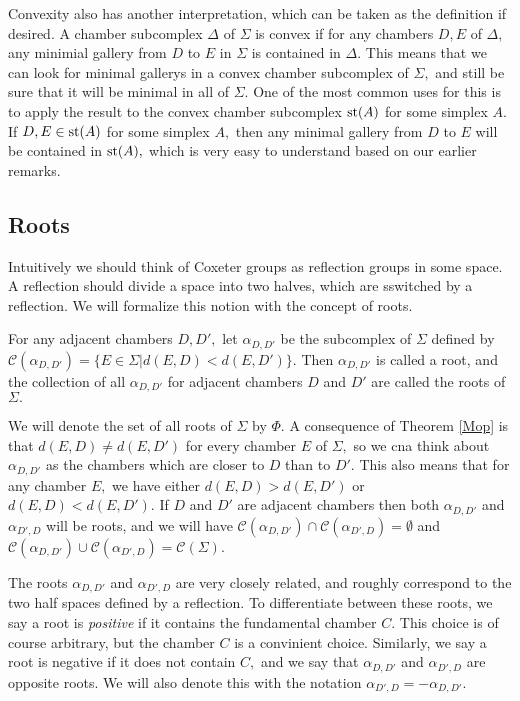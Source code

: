 \documentclass[class=book, crop=false,12 pt]{standalone}
\begin{document}
Convexity also has another interpretation, which can be taken as the definition if desired. A chamber subcomplex $\Delta$ of $\Sigma$ is convex if for any chambers $D,E$ of $\Delta,$ any minimial gallery from $D$ to $E$ in $\Sigma$ is contained in $\Delta.$ This means that we can look for minimal gallerys in a convex chamber subcomplex of $\Sigma,$ and still be sure that it will be minimal in all of $\Sigma.$ One of the most common uses for this is to apply the result to the convex chamber subcomplex $\mathrm{st}(A)$ for some simplex $A.$ If $D,E\in \mathrm{st}(A)$ for some simplex $A,$ then any minimal gallery from $D$ to $E$ will be contained in $\mathrm{st}(A),$ which is very easy to understand based on our earlier remarks.

\subsection{Roots}
Intuitively we should think of Coxeter groups as reflection groups in some space. A reflection should divide a space into two halves, which are sswitched by a reflection. We will formalize this notion with the concept of roots.

\begin{defn}
	\label{defn:root}
	For any adjacent chambers $D,D',$ let $\alpha_{D,D'}$ be the subcomplex of $\Sigma$ defined by $\mathcal{C}(\alpha_{D,D'})=\{E\in \Sigma|d(E,D)<d(E,D')\}.$ Then $\alpha_{D,D'}$ is called a root, and the collection of all $\alpha_{D,D'}$ for adjacent chambers $D$ and $D'$ are called the roots of $\Sigma.$
\end{defn}

We will denote the set of all roots of $\Sigma$ by $\Phi.$ A consequence of Theorem \ref{Mop} is that $d(E,D)\neq d(E,D')$ for every chamber $E$ of $\Sigma,$ so we cna think about $\alpha_{D,D'}$ as the chambers which are closer to $D$ than to $D'.$ This also means that for any chamber $E,$ we have either $d(E,D)>d(E,D')$ or $d(E,D)<d(E,D').$ If $D$ and $D'$ are adjacent chambers then both $\alpha_{D,D'}$ and $\alpha_{D',D}$ will be roots, and we will have $\mathcal{C}(\alpha_{D,D'})\cap \mathcal{C}(\alpha_{D',D})=\emptyset$ and $\mathcal{C}(\alpha_{D,D'})\cup \mathcal{C}(\alpha_{D',D})=\mathcal{C}(\Sigma).$

The roots $\alpha_{D,D'}$ and $\alpha_{D',D}$ are very closely related, and roughly correspond to the two half spaces defined by a reflection. To differentiate between these roots, we say a root is \emph{positive} if it contains the fundamental chamber $C.$ This choice is of course arbitrary, but the chamber $C$ is a convinient choice. Similarly, we say a root is negative if it does not contain $C,$ and we say that $\alpha_{D,D'}$ and $\alpha_{D',D}$ are opposite roots. We will also denote this with the notation $\alpha_{D',D}=-\alpha_{D,D'}.$
\end{document}
